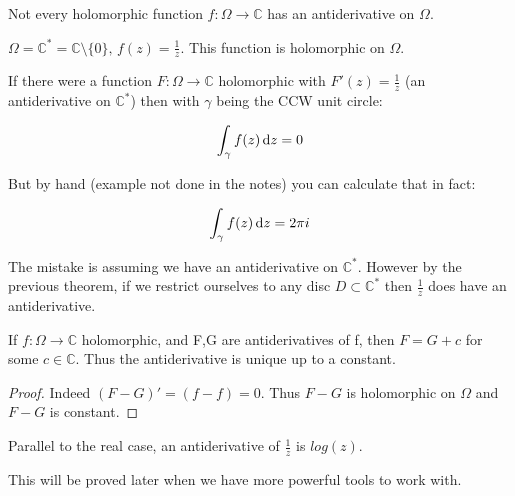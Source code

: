 \begin{remark}
Not every holomorphic function $f:\Omega \rightarrow \mathbb{C}$ has an antiderivative on $\Omega$.

\end{remark}


\begin{example}

$\Omega = \mathbb{C}^* = \mathbb{C} \setminus \{0\}, \, f(z)=\frac{1}{z}$. This function is holomorphic on $\Omega$. 

If there were a function $F:\Omega\rightarrow\mathbb{C}$ holomorphic with $F'(z) = \frac{1}{z}$ (an antiderivative on $\mathbb{C}^*$) then with $\gamma$ being the CCW unit circle:

\begin{align*}
    \int_\gamma f(z) \dif z = 0\\
\end{align*}

But by hand (example not done in the notes) you can calculate that in fact:

\begin{align*}
    \int_\gamma f(z) \dif z = 2\pi i\\
\end{align*}

The mistake is assuming we have an antiderivative on $\mathbb{C}^*$. However by the previous theorem, if we restrict ourselves to any disc $D \subset \mathbb{C}^*$ then $\frac{1}{z}$ does have an antiderivative.

\end{example}

\begin{remark}
If $f:\Omega \rightarrow \mathbb{C}$ holomorphic, and F,G are antiderivatives of f, then $F=G+c $ for some $c\in \mathbb{C}$. Thus the antiderivative is unique up to a constant.
\end{remark}

\begin{proof}
Indeed $(F-G)'= (f-f) = 0$. Thus $F-G$ is holomorphic on $\Omega$ and $F-G$ is constant.
\end{proof}

\begin{remark}
Parallel to the real case, an antiderivative of $\frac{1}{z}$ is $log(z)$.
\end{remark}

This will be proved later when we have more powerful tools to work with.

